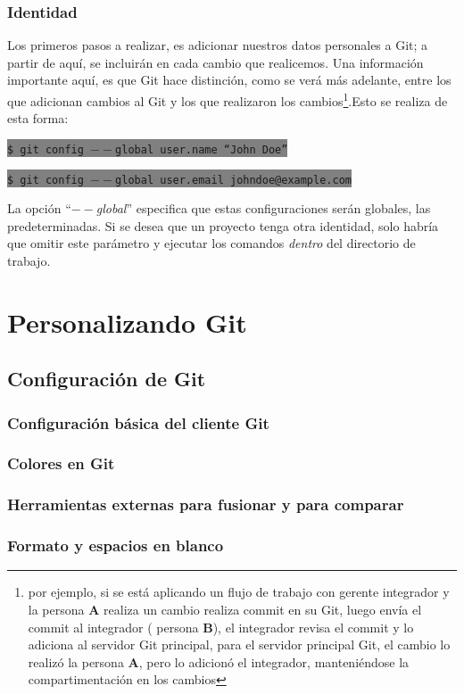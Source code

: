 \documentclass[12pt, spanish, oneside, onecolumn, a4paper]{report}
\newcommand{\shellcmd}[1]{ %

  \colorbox{Gray}{
    \indent\indent\texttt{\footnotesize\$ #1}
  }

}
\begin{document}
\subsection{Identidad} 
\label{sec:youridentity} Los primeros pasos a realizar, es adicionar nuestros datos personales a Git; a partir de aquí, se incluirán en cada cambio que realicemos. Una información importante aquí, es que Git hace distinción, como se verá más adelante, entre los que adicionan cambios al Git y los que realizaron los cambios\footnote{por ejemplo, si se está aplicando un flujo de trabajo con gerente integrador y la persona \textbf{A} realiza un cambio realiza commit en su Git, luego envía el commit al integrador ( persona \textbf{B}), el integrador revisa el commit y lo adiciona al servidor Git principal, para el servidor principal Git, el cambio lo realizó la persona \textbf{A}, pero lo adicionó el integrador, manteniéndose la compartimentación en los cambios}.Esto se realiza de esta forma: 
\shellcmd{git config $--$global user.name ``John Doe''} 
\shellcmd{git config $--$global user.email johndoe@example.com}
La opción ``\emph{$--$global}'' especifica que estas configuraciones serán globales, las predeterminadas. Si se desea que un proyecto tenga otra identidad, solo habría que omitir este parámetro y ejecutar los comandos \emph{dentro} del directorio de trabajo. 

\chapter{Personalizando Git} 
\label{chap:customizinggit} 
\section{Configuración de Git} 
\label{sec:configuringgit} 
\subsection{Configuración básica del cliente Git} 
\label{sec:basicconf} 
\subsection{Colores en Git} 
\label{sec:colors} 
\subsection{Herramientas externas para fusionar y para comparar} 
\label{sec:externaltools} 
\subsection{Formato y espacios en blanco} 
\label{sec:formatsandspaces} 
\end{document}
